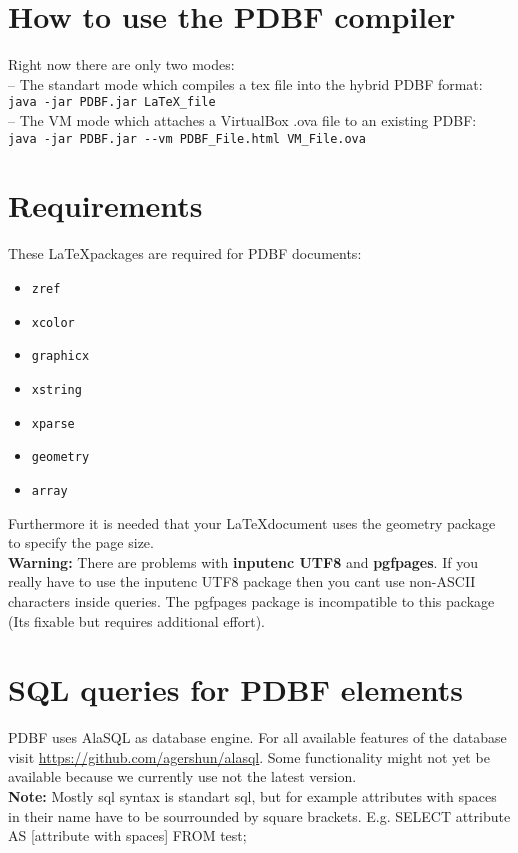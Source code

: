 \documentclass[11pt]{article}
\begin{document}
\section{How to use the PDBF compiler}
Right now there are only two modes: \\[4pt]
-- The standart mode which compiles a tex file into the hybrid PDBF format:\\
\verb|java -jar PDBF.jar LaTeX_file| \\[2pt]
-- The VM mode which attaches a VirtualBox .ova file to an existing PDBF:\\
\verb|java -jar PDBF.jar --vm PDBF_File.html VM_File.ova|

\section{Requirements}
These \LaTeX\relax packages are required for PDBF documents:
\begin{itemize}
\item \verb|zref|
\item \verb|xcolor|
\item \verb|graphicx|
\item \verb|xstring|
\item \verb|xparse|
\item \verb|geometry|
\item \verb|array|
\end{itemize}
\noindent Furthermore it is needed that your \LaTeX\relax document uses the geometry package to specify the page size.\\

\noindent \textbf{Warning:} There are problems with \textbf{inputenc UTF8} and \textbf{pgfpages}. If you really have to use the inputenc UTF8 package then you cant use non-ASCII characters inside queries. The pgfpages package is incompatible to this package (Its fixable but requires additional effort). 

\section{SQL queries for PDBF elements}
PDBF uses AlaSQL as database engine. For all available features of the database visit \url{https://github.com/agershun/alasql}. Some functionality might not yet be available because we currently use not the latest version.\\[4pt]
\textbf{Note:} Mostly sql syntax is standart sql, but for example attributes with spaces in their name have to be sourrounded by square brackets. E.g. SELECT attribute AS [attribute with spaces] FROM test;\\
\end{document}
